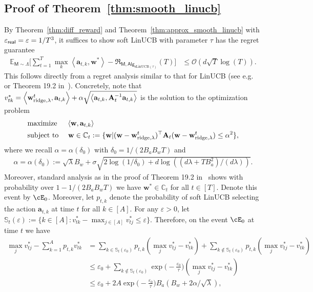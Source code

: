 \documentclass[10pt]{article}
\renewcommand{\epsilon}{\varepsilon}
\newcommand{\eps}{\varepsilon}
\renewcommand{\cO}{\mathcal{O}}
\newcommand{\<}{\left\langle}
\renewcommand{\>}{\right\rangle}
\newcommand{\ridge}{{\rm ridge}}
\newcommand{\E}{\mathbb{E}}
\newcommand{\inst}{{\mathsf{M}}}
\newcommand{\sLinUCB}{{\mathrm{sLinUCB}}}
\newcommand{\temp}{{\tau}}
\newcommand{\cwid}{{\alpha}}
\newcommand{\totlen}{{T}}
\newcommand{\sAlg}{{\mathsf{Alg}}}
\newcommand{\prior}{{\Lambda}}
\newcommand{\geneps}{{\epsilon}_{\sf real}}
\newcommand{\totreward}{{\mathfrak{R}}}
\def\sC{{\mathbb{C}}}
\def\sS{{\mathbb{S}}}
\def\bA{{\mathbf A}}
\def\ba{{\mathbf a}}
\def\bw{{\mathbf w}}
\begin{document}
\subsection{Proof of Theorem~\ref{thm:smooth_linucb}}\label{sec:pf_thm:smooth_linucb}
By Theorem~\ref{thm:diff_reward} and Theorem~\ref{thm:approx_smooth_linucb} with ${\geneps=\eps=1/\totlen^3}$, it suffices to show soft LinUCB with parameter $\temp$ has the regret guarantee \begin{align*}
\E_{\inst\sim\prior}\Big[\sum_{t=1}^\totlen\max_{k}\<\ba_{t,k},\bw^*\>-\totreward_{\inst,\sAlg_{\sLinUCB(\temp)}}(\totlen)\Big]&\leq\cO(d\sqrt{T}\log(T)).
\end{align*}
This follows directly from a  regret analysis similar to  that for LinUCB (see e.g.~\cite{chu2011contextual} or  Theorem 19.2 in~\cite{lattimore2020bandit}). Concretely, note that $v_{tk}^*=\<\bw^t_{\ridge,\lambda},\ba_{t,k}\>+\alpha\sqrt{\<\ba_{t,k}, {\bA_t^{-1} \ba_{t,k}}\>}$ is the solution to the optimization problem
\begin{align*}&\text{maximize }~~~\<\bw,\ba_{t,k}\>
\\
&\text{subject to }~~~\bw\in \sC_t:=\{\bw|(\bw-\bw^t_{\ridge,\lambda})^\top\bA_t(\bw-\bw^t_{\ridge,\lambda})\leq\alpha^2\},
\end{align*}
where we recall $\alpha=\alpha(\delta_0)$ with $\delta_0=1/(2B_aB_wT)$ and
\begin{align}
\cwid=\cwid(\delta_0):=\sqrt{\lambda}B_w+\sigma\sqrt{2\log(1/\delta_0)+d\log((d\lambda+TB_a^2)/(d\lambda))}.\label{eq:recall_alpha_formula}
\end{align}
Moreover, standard analysis as in the proof of Theorem 19.2 in~\cite{lattimore2020bandit} shows with probability over $1-1/(2B_aB_wT)$ we have $\bw^*\in\sC_t$ for all $t\in[T]$. Denote this event by $\cE_0$. Moreover, let $p_{t,k}$ denote the probability of soft LinUCB selecting the action $\ba_{t,k}$ at time $t$ for all $k\in[A]$.  For any $\eps>0$, let $\sS_t(\eps):=\{k\in[A]:v^*_{tk}-\max_{j\in[A]}v^*_{tj}\leq \eps\}$.
Therefore, on the event $\cE_0$ at time $t$ we have
\begin{align*}
    \max_{j}v^*_{tj}-\sum_{k=1}^A p_{t,k}v^*_{tk}&= \sum_{k\in\sS_t(\eps_0)} p_{t,k}(\max_{j}v^*_{tj}-v^*_{tk})+\sum_{k\notin\sS_t(\eps_0)} p_{t,k}(\max_{j}v^*_{tj}-v^*_{tk})\\
    &\leq \eps_0+\sum_{k\notin\sS_t(\eps_0)} \exp\Big(-\frac{\eps_0}{\temp}\Big)(\max_{j}v^*_{tj}-v^*_{tk})\\
    &\leq \eps_0+2A\exp\Big(-\frac{\eps_0}{\temp}\Big)B_a(B_w+2\alpha/\sqrt{\lambda}),
\end{align*}
\end{document}

